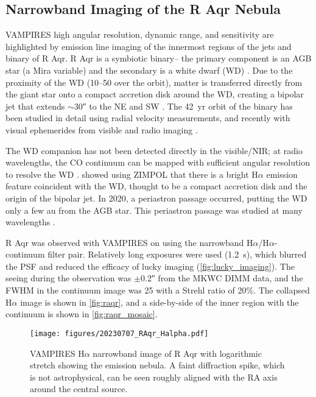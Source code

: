 \subsection{Narrowband Imaging of the R Aqr Nebula\label{sec:raqr}}

VAMPIRES high angular resolution, dynamic range, and sensitivity are highlighted by emission line imaging of the innermost regions of the jets and binary of R Aqr. R Aqr is a symbiotic binary-- the primary component is an AGB star (a Mira variable) and the secondary is a white dwarf (WD) \citep{merrill_partial_1935,merrill_spectra_1940}. Due to the proximity of the WD (\SIrange{10}{50}{\mas} over the orbit), matter is transferred directly from the giant star onto a compact accretion disk around the WD, creating a bipolar jet that extends $\sim$\ang{;;30} to the NE and SW \citep[and references therein]{schmid_spherezimpol_2017}. The \SI{42}{yr} orbit of the binary has been studied in detail using radial velocity measurements, and recently with visual ephemerides from visible and radio imaging \citep{gromadzki_spectroscopic_2009,bujarrabal_high-resolution_2018,alcolea_determining_2023}. 

The WD companion has not been detected directly in the visible/NIR; at radio wavelengths, the CO continuum can be mapped with sufficient angular resolution to resolve the WD \citep{bujarrabal_high-resolution_2018,alcolea_determining_2023}. \citet{schmid_spherezimpol_2017} showed using ZIMPOL that there is a bright H$\alpha$ emission feature coincident with the WD, thought to be a compact accretion disk and the origin of the bipolar jet. In 2020, a periastron passage occurred, putting the WD only a few \si{au} from the AGB star. This periastron passage was studied at many wavelengths \citep{hinkle_2020_2022,sacchi_front-row_2024}.

R Aqr was observed with VAMPIRES on  using the narrowband H$\alpha$/H$\alpha$-continuum filter pair. Relatively long exposures were used (\SI{1.2}{s}), which blurred the PSF and reduced the efficacy of lucky imaging (\autoref{fig:lucky_imaging}). The seeing during the observation was $\pm$\ang{;;0.2} from the MKWC DIMM data, and the FWHM in the continuum image was \SI{25}{\mas} with a Strehl ratio of 20\%. The collapsed H$\alpha$ image is shown in \autoref{fig:raqr}, and a side-by-side of the inner region with the continuum is shown in \autoref{fig:raqr_mosaic}.


\begin{figure}
    \centering
    \texttt{[image: figures/20230707\_RAqr\_Halpha.pdf]}
    \caption{VAMPIRES H$\alpha$ narrowband image of R Aqr with logarithmic stretch showing the emission nebula. A faint diffraction spike, which is not astrophysical, can be seen roughly aligned with the RA axis around the central source.\label{fig:raqr}}
\end{figure}

